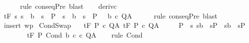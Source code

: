 \begin{isabellebody}
\ \ \ \ \isamarkupfalse%
\ {\isacharparenleft}rule\ conseqPre{\isacharparenright}\ blast\isanewline
{}\isamarkupfalse%
\isanewline
\ \ \isamarkupfalse%
\ deriv{\isacharunderscore}c{}\ \isanewline
\ \ \isamarkupfalse%
\ {\isachardoublequoteopen}{\isasymGamma}{\isacharcomma}{\isasymTheta}{\isasymturnstile}\isactrlsub t\isactrlbsub {\isacharslash}F\isactrlesub \ {\isacharparenleft}{\isacharbraceleft}s{\isachardot}\ {\isacharparenleft}s\ {\isasymin}\ b\ {\isasymlongrightarrow}\ s\ {\isasymin}\ P\ {\isasymand}\ {\isacharparenleft}s\ {\isasymnotin}\ b\ {\isasymlongrightarrow}\ s\ {\isasymin}\ P\ {\isasyminter}\ {\isacharminus}\ b{\isacharparenright}\ c\ Q{\isacharcomma}A{\isachardoublequoteclose}\isanewline
\ \ \ \ \isamarkupfalse%
\ {\isacharparenleft}rule\ conseqPre{\isacharparenright}\ blast\isanewline
{}\isamarkupfalse%
\ {\isacharparenleft}insert\ wp{\isacharparenright}%
\endisatagproof
{\isafoldproof}%
%
\isadelimproof
\isanewline
%
\endisadelimproof
\isanewline
\isanewline
{}\isamarkupfalse%
\ CondSwap{\isacharcolon}\ \isanewline
\ \ {\isachardoublequoteopen}{\isasymlbrakk}{\isasymGamma}{\isacharcomma}{\isasymTheta}{\isasymturnstile}\isactrlsub t\isactrlbsub {\isacharslash}F\isactrlesub \ P{}\ c{}\ Q{\isacharcomma}A{\isacharsemicolon}\ {\isasymGamma}{\isacharcomma}{\isasymTheta}{\isasymturnstile}\isactrlsub t\isactrlbsub {\isacharslash}F\isactrlesub \ P{}\ c{}\ Q{\isacharcomma}A{\isacharsemicolon}\ \isanewline
\ \ \ \ P\ {\isasymsubseteq}\ {\isacharbraceleft}s{\isachardot}\ {\isacharparenleft}s{\isasymin}b\ {\isasymlongrightarrow}\ s{\isasymin}P{}{\isacharparenright}\ {\isasymand}\ {\isacharparenleft}s{\isasymnotin}b\ {\isasymlongrightarrow}\ s{\isasymin}P{}{\isacharparenright}{\isacharbraceright}{\isasymrbrakk}\isanewline
\ \ \ {\isasymLongrightarrow}\ \isanewline
\ \ \ {\isasymGamma}{\isacharcomma}{\isasymTheta}{\isasymturnstile}\isactrlsub t\isactrlbsub {\isacharslash}F\isactrlesub \ P\ {\isacharparenleft}Cond\ b\ c{}\ c{}{\isacharparenright}\ Q{\isacharcomma}A{\isachardoublequoteclose}\isanewline
%
\isadelimproof
\ \ %
\endisadelimproof
%
\isatagproof
{}\isamarkupfalse%
\ {\isacharparenleft}rule\ Cond{\isacharparenright}%
\endisatagproof
{\isafoldproof}%
%
\isadelimproof
\isanewline
%
\endisadelimproof

\end{isabellebody}
